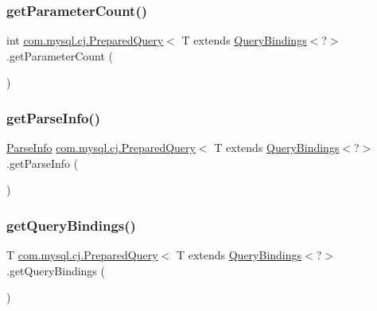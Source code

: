 \subsubsection{\texorpdfstring{get\+Parameter\+Count()}{getParameterCount()}}
{\footnotesize\ttfamily int \mbox{\hyperlink{interfacecom_1_1mysql_1_1cj_1_1_prepared_query}{com.\+mysql.\+cj.\+Prepared\+Query}}$<$ T extends \mbox{\hyperlink{interfacecom_1_1mysql_1_1cj_1_1_query_bindings}{Query\+Bindings}}$<$?$>$.get\+Parameter\+Count (\begin{DoxyParamCaption}{ }\end{DoxyParamCaption})}

\mbox{\label{interfacecom_1_1mysql_1_1cj_1_1_prepared_query_a4c05f98057039c47c3866f4113bd2d4e}} 
\subsubsection{\texorpdfstring{get\+Parse\+Info()}{getParseInfo()}}
{\footnotesize\ttfamily \mbox{\hyperlink{classcom_1_1mysql_1_1cj_1_1_parse_info}{Parse\+Info}} \mbox{\hyperlink{interfacecom_1_1mysql_1_1cj_1_1_prepared_query}{com.\+mysql.\+cj.\+Prepared\+Query}}$<$ T extends \mbox{\hyperlink{interfacecom_1_1mysql_1_1cj_1_1_query_bindings}{Query\+Bindings}}$<$?$>$.get\+Parse\+Info (\begin{DoxyParamCaption}{ }\end{DoxyParamCaption})}

\mbox{\label{interfacecom_1_1mysql_1_1cj_1_1_prepared_query_a437189199c669b86be0b4407e6d44d5d}} 
\subsubsection{\texorpdfstring{get\+Query\+Bindings()}{getQueryBindings()}}
{\footnotesize\ttfamily T \mbox{\hyperlink{interfacecom_1_1mysql_1_1cj_1_1_prepared_query}{com.\+mysql.\+cj.\+Prepared\+Query}}$<$ T extends \mbox{\hyperlink{interfacecom_1_1mysql_1_1cj_1_1_query_bindings}{Query\+Bindings}}$<$?$>$.get\+Query\+Bindings (\begin{DoxyParamCaption}{ }\end{DoxyParamCaption})}

